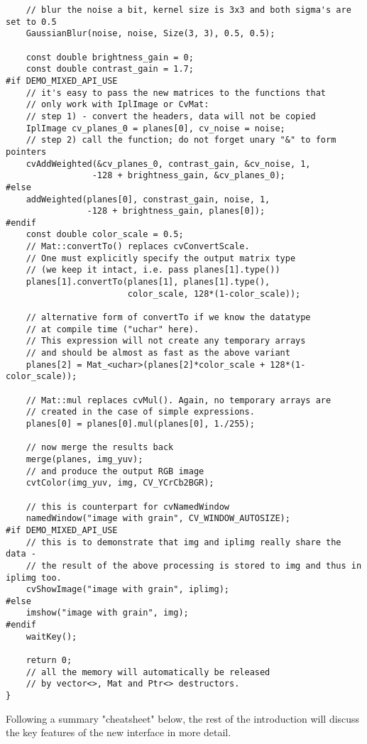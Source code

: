 \begin{lstlisting}
    // blur the noise a bit, kernel size is 3x3 and both sigma's are set to 0.5
    GaussianBlur(noise, noise, Size(3, 3), 0.5, 0.5);

    const double brightness_gain = 0;
    const double contrast_gain = 1.7;
#if DEMO_MIXED_API_USE
    // it's easy to pass the new matrices to the functions that
    // only work with IplImage or CvMat:
    // step 1) - convert the headers, data will not be copied
    IplImage cv_planes_0 = planes[0], cv_noise = noise;
    // step 2) call the function; do not forget unary "&" to form pointers
    cvAddWeighted(&cv_planes_0, contrast_gain, &cv_noise, 1,
                 -128 + brightness_gain, &cv_planes_0);
#else
    addWeighted(planes[0], constrast_gain, noise, 1,
                -128 + brightness_gain, planes[0]);
#endif
    const double color_scale = 0.5;
    // Mat::convertTo() replaces cvConvertScale.
    // One must explicitly specify the output matrix type
    // (we keep it intact, i.e. pass planes[1].type())
    planes[1].convertTo(planes[1], planes[1].type(),
                        color_scale, 128*(1-color_scale));

    // alternative form of convertTo if we know the datatype
    // at compile time ("uchar" here).
    // This expression will not create any temporary arrays
    // and should be almost as fast as the above variant
    planes[2] = Mat_<uchar>(planes[2]*color_scale + 128*(1-color_scale));

    // Mat::mul replaces cvMul(). Again, no temporary arrays are
    // created in the case of simple expressions.
    planes[0] = planes[0].mul(planes[0], 1./255);

    // now merge the results back
    merge(planes, img_yuv);
    // and produce the output RGB image
    cvtColor(img_yuv, img, CV_YCrCb2BGR);

    // this is counterpart for cvNamedWindow
    namedWindow("image with grain", CV_WINDOW_AUTOSIZE);
#if DEMO_MIXED_API_USE
    // this is to demonstrate that img and iplimg really share the data -
    // the result of the above processing is stored to img and thus in iplimg too.
    cvShowImage("image with grain", iplimg);
#else
    imshow("image with grain", img);
#endif
    waitKey();

    return 0;
    // all the memory will automatically be released
    // by vector<>, Mat and Ptr<> destructors.
}
\end{lstlisting}

Following a summary "cheatsheet" below, the rest of the introduction will discuss the key features of the new interface in more detail.



